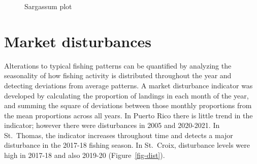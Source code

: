 \documentclass[
  letterpaper,
  oneside,
  open=any]{scrbook}
\begin{document}
\begin{figure}


\caption{\label{fig-sarg}Sargassum plot}

\end{figure}%

\section{Market disturbances}\label{market-disturbances}

Alterations to typical fishing patterns can be quantified by analyzing
the seasonality of how fishing activity is distributed throughout the
year and detecting deviations from average patterns. A market
disturbance indicator was developed by calculating the proportion of
landings in each month of the year, and summing the square of deviations
between those monthly proportions from the mean proportions across all
years. In Puerto Rico there is little trend in the indicator; however
there were disturbances in 2005 and 2020-2021. In St.~Thomas, the
indicator increases throughout time and detects a major disturbance in
the 2017-18 fishing season. In St.~Croix, disturbance levels were high
in 2017-18 and also 2019-20 (Figure~\ref{fig-dist}).
\end{document}
